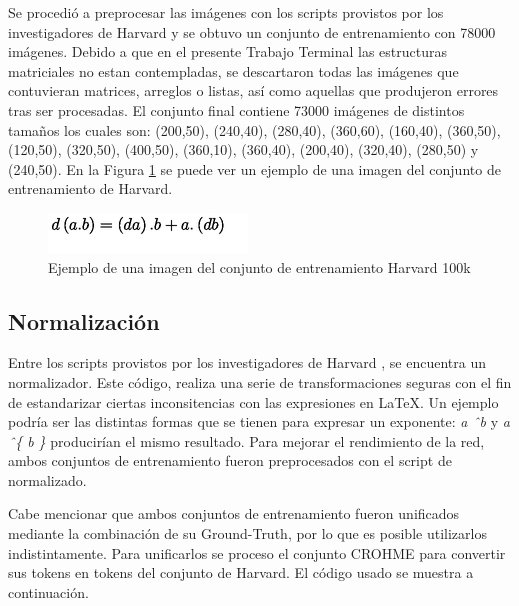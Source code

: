 Se procedió a preprocesar las imágenes con los scripts provistos por los investigadores de Harvard y se obtuvo un conjunto de entrenamiento con 78000 imágenes. Debido a que en el presente Trabajo Terminal las estructuras matriciales no estan contempladas, se descartaron todas las imágenes que contuvieran matrices, arreglos o listas, así como aquellas que produjeron errores tras ser procesadas. El conjunto final contiene 73000 imágenes de distintos tamaños los cuales son: (200,50), (240,40), (280,40), (360,60), (160,40), (360,50), (120,50), (320,50), (400,50), (360,10), (360,40), (200,40), (320,40), (280,50) y (240,50). En la Figura \ref{fig:harvard-example} se puede ver un ejemplo de una imagen del conjunto de entrenamiento de Harvard.

\begin{figure}[H]
	\centering
	\includegraphics{capitulo5/dataset/harvard}
	\caption{Ejemplo de una imagen del conjunto de entrenamiento Harvard 100k}
	\label{fig:harvard-example}
\end{figure}

\subsection{Normalización}

Entre los scripts provistos por los investigadores de Harvard \cite{harvard-scripts}, se encuentra un normalizador. Este código, realiza una serie de transformaciones seguras con el fin de estandarizar ciertas inconsitencias con las expresiones en \LaTeX{}. Un ejemplo podría ser las distintas formas que se tienen para expresar un exponente: \textit{a \^\ b} y \textit{a \^\ \{ b \}} producirían el mismo resultado. Para mejorar el rendimiento de la red, ambos conjuntos de entrenamiento fueron preprocesados con el script de normalizado.

Cabe mencionar que ambos conjuntos de entrenamiento fueron unificados mediante la combinación de su Ground-Truth, por lo que es posible utilizarlos indistintamente. Para unificarlos se proceso el conjunto CROHME para convertir sus tokens en tokens del conjunto de Harvard. El código usado se muestra a continuación.



\newpage


